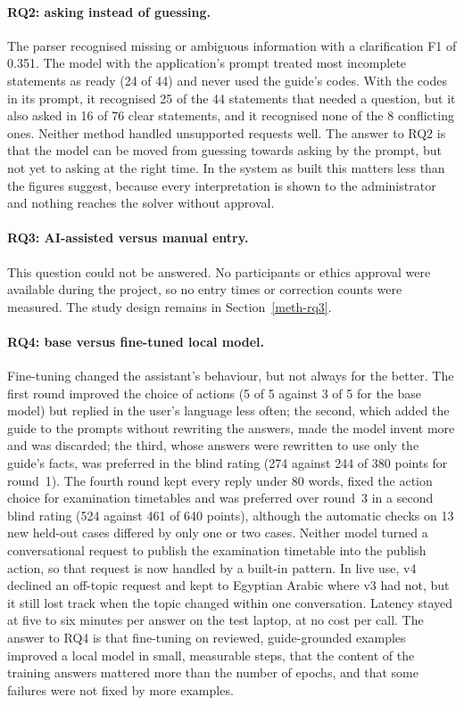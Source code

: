 \paragraph{RQ2: asking instead of guessing.} The parser recognised missing or ambiguous information with a clarification F1 of 0.351. The model with the application's prompt treated most incomplete statements as ready (24 of 44) and never used the guide's codes. With the codes in its prompt, it recognised 25 of the 44 statements that needed a question, but it also asked in 16 of 76 clear statements, and it recognised none of the 8 conflicting ones. Neither method handled unsupported requests well. The answer to RQ2 is that the model can be moved from guessing towards asking by the prompt, but not yet to asking at the right time. In the system as built this matters less than the figures suggest, because every interpretation is shown to the administrator and nothing reaches the solver without approval.

\paragraph{RQ3: AI-assisted versus manual entry.} This question could not be answered. No participants or ethics approval were available during the project, so no entry times or correction counts were measured. The study design remains in Section~\ref{meth-rq3}.

\paragraph{RQ4: base versus fine-tuned local model.} Fine-tuning changed the assistant's behaviour, but not always for the better. The first round improved the choice of actions (5 of 5 against 3 of 5 for the base model) but replied in the user's language less often; the second, which added the guide to the prompts without rewriting the answers, made the model invent more and was discarded; the third, whose answers were rewritten to use only the guide's facts, was preferred in the blind rating (274 against 244 of 380 points for round~1). The fourth round kept every reply under 80 words, fixed the action choice for examination timetables and was preferred over round~3 in a second blind rating (524 against 461 of 640 points), although the automatic checks on 13 new held-out cases differed by only one or two cases. Neither model turned a conversational request to publish the examination timetable into the publish action, so that request is now handled by a built-in pattern. In live use, v4 declined an off-topic request and kept to Egyptian Arabic where v3 had not, but it still lost track when the topic changed within one conversation. Latency stayed at five to six minutes per answer on the test laptop, at no cost per call. The answer to RQ4 is that fine-tuning on reviewed, guide-grounded examples improved a local model in small, measurable steps, that the content of the training answers mattered more than the number of epochs, and that some failures were not fixed by more examples.

